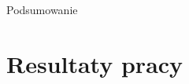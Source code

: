  \begin{chapter}{Podsumowanie}
	\newcommand{\chapterPath}{chapters/Summary}

	\section{Resultaty pracy}
	
\end{chapter}
